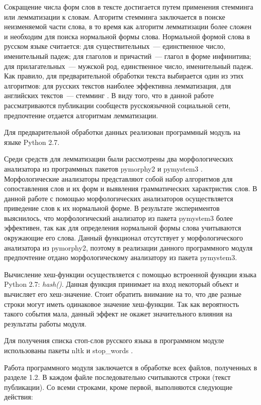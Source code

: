 \documentclass[a4paper]{report}
\begin{document}
	
	Сокращение числа форм слов в тексте достигается путем применения стемминга или лемматизации к словам. Алгоритм стемминга заключается в поиске неизменяемой части слова, в то время как алгоритм лемматизации более сложен и необходим для поиска нормальной формы слова. Нормальной формой слова в русском языке считается: для существительных~--- единственное число, именительный падеж; для глаголов и причастий~--- глагол в форме инфинитива; для прилагательных~--- мужской род, единственное число, именительный падеж. Как правило, для предварительной обработки текста выбирается один из этих алгоритмов: для русских текстов наиболее эффективна лемматизация, для английских текстов~--- стемминг \cite{bib:Voron1}. В виду того, что в данной работе рассматриваются публикации сообществ русскоязычной социальной сети, предпочтение отдается алгоритмам лемматизации.
	
	 
	
	Для предварительной обработки данных реализован программный модуль на языке Python 2.7.
	
	Среди средств для лемматизации были рассмотрены два морфологических анализатора из программных пакетов pymorphy2 \cite{bib:pymorphy2} и pymystem3 \cite{bib:pymystem3}. Морфологические анализаторы представляют собой набор алгоритмов для сопоставления слов и их форм и выявления грамматических характристик слов. В данной работе с помощью морфологических анализаторов осуществляется приведение слов к их нормальной форме. В результате экспериментов выяснилось, что морфологический анализатор из пакета pymystem3 более эффективен, так как для определения нормальной формы слова учитываются окружающие его слова. Данный функционал отсутствует у морфологического анализатора из pymorphy2, поэтому в реализации данного программного модуля предпочтение отдано морфологическому анализатору из пакета pymystem3.
	
	Вычисление хеш-функции осуществляется с помощью встроенной функции языка Python 2.7: \textit{hash()}. Данная функция принимает на вход некоторый объект и вычисляет его хеш-значение. Стоит обратить внимание на то, что две разные строки могут иметь одинаковое значение хеш-функции. Так как вероятность такого события мала, данный эффект не окажет значительного влияния на результаты работы модуля.
	
	Для получения списка стоп-слов русского языка в программном модуле использованы пакеты nltk \cite{bib:nltk} и stop\_words \cite{bib:sw}.
	
	Работа программного модуля заключается в обработке всех файлов, полученных в разделе 1.2. В каждом файле последовательно считываются строки (текст публикации). Со всеми строками, кроме первой, выполняются следующие действия:
	
\end{document}
